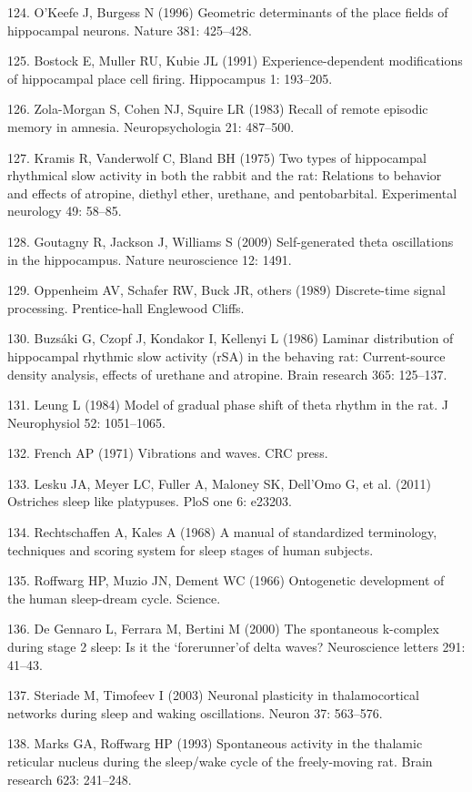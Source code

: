 \documentclass[]{article}
\begin{document}
124. O'Keefe J, Burgess N (1996) Geometric determinants of the place
fields of hippocampal neurons. Nature 381: 425--428.

125. Bostock E, Muller RU, Kubie JL (1991) Experience-dependent
modifications of hippocampal place cell firing. Hippocampus 1: 193--205.

126. Zola-Morgan S, Cohen NJ, Squire LR (1983) Recall of remote episodic
memory in amnesia. Neuropsychologia 21: 487--500.

127. Kramis R, Vanderwolf C, Bland BH (1975) Two types of hippocampal
rhythmical slow activity in both the rabbit and the rat: Relations to
behavior and effects of atropine, diethyl ether, urethane, and
pentobarbital. Experimental neurology 49: 58--85.

128. Goutagny R, Jackson J, Williams S (2009) Self-generated theta
oscillations in the hippocampus. Nature neuroscience 12: 1491.

129. Oppenheim AV, Schafer RW, Buck JR, others (1989) Discrete-time
signal processing. Prentice-hall Englewood Cliffs.

130. Buzs{á}ki G, Czopf J, Kondakor I, Kellenyi L (1986) Laminar
distribution of hippocampal rhythmic slow activity (rSA) in the behaving
rat: Current-source density analysis, effects of urethane and atropine.
Brain research 365: 125--137.

131. Leung L (1984) Model of gradual phase shift of theta rhythm in the
rat. J Neurophysiol 52: 1051--1065.

132. French AP (1971) Vibrations and waves. CRC press.

133. Lesku JA, Meyer LC, Fuller A, Maloney SK, Dell'Omo G, et al. (2011)
Ostriches sleep like platypuses. PloS one 6: e23203.

134. Rechtschaffen A, Kales A (1968) A manual of standardized
terminology, techniques and scoring system for sleep stages of human
subjects.

135. Roffwarg HP, Muzio JN, Dement WC (1966) Ontogenetic development of
the human sleep-dream cycle. Science.

136. De Gennaro L, Ferrara M, Bertini M (2000) The spontaneous k-complex
during stage 2 sleep: Is it the `forerunner'of delta waves? Neuroscience
letters 291: 41--43.

137. Steriade M, Timofeev I (2003) Neuronal plasticity in
thalamocortical networks during sleep and waking oscillations. Neuron
37: 563--576.

138. Marks GA, Roffwarg HP (1993) Spontaneous activity in the thalamic
reticular nucleus during the sleep/wake cycle of the freely-moving rat.
Brain research 623: 241--248.
\end{document}
